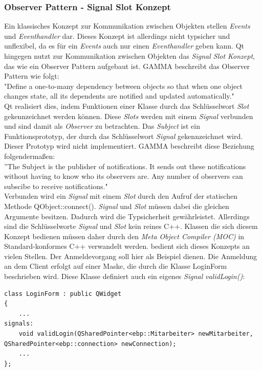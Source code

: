 \subsubsection{Observer Pattern - Signal Slot Konzept}
Ein klassisches Konzept zur Kommunikation zwischen Objekten stellen \textit{Events} und \textit{Eventhandler} dar. Dieses Konzept ist allerdings nicht typsicher und unflexibel, da es für ein \textit{Events} auch nur einen \textit{Eventhandler} geben kann\cite[S. 32]{Qt4}. Qt hingegen nutzt zur Kommunikation zwischen Objekten das \textit{Signal Slot Konzept}, das wie ein Observer Pattern aufgebaut ist. GAMMA beschreibt das Observer Pattern wie folgt: \\
"Define a one-to-many dependency between objects so that when one object changes state, all its dependents are notified and updated automatically\cite[S. 293]{Entwurfsmuster}."\\
Qt realisiert dies, indem Funktionen einer Klasse durch das Schlüsselwort \textit{Slot} gekennzeichnet werden können. Diese \textit{Slots} werden mit einem \textit{Signal} verbunden und sind damit als \textit{Observer} zu betrachten. Das \textit{Subject} ist ein Funktionsprototyp, der durch das Schlüsselwort \textit{Signal} gekennzeichnet wird. Dieser Prototyp wird nicht implementiert. GAMMA beschreibt diese Beziehung folgendermaßen:\\
''The Subject is the publisher of notifications. It sends out these notifications without having  to know who its observers are. Any number of observers can subscibe to receive notifications\cite[S. 294]{Entwurfsmuster}."\\
Verbunden wird ein \textit{Signal} mit einem \textit{Slot} durch den Aufruf der statischen Methode QObject::connect(). \textit{Signal} und \textit{Slot} müssen dabei die gleichen Argumente besitzen. Dadurch wird die Typsicherheit gewährleistet. Allerdings sind die Schlüsselworte \textit{Signal} und \textit{Slot} kein reines C++. Klassen die sich diesem Konzept bedienen müssen daher durch den \textit{Meta Object Compiler (MOC)} in Standard-konformes C++ verwandelt werden\cite[Vgl. S. 51]{Qt4}.
\EBP bedient sich dieses Konzepts an vielen Stellen. Der Anmeldevorgang soll hier als Beispiel dienen. Die Anmeldung an dem Client erfolgt auf einer Maske, die durch die Klasse LoginForm beschrieben wird. Diese Klasse definiert auch ein eigenes \textit{Signal} \textit{validLogin()}:
\begin{lstlisting}
class LoginForm : public QWidget
{
    ...
signals:
    void validLogin(QSharedPointer<ebp::Mitarbeiter> newMitarbeiter, QSharedPointer<ebp::connection> newConnection);
    ...
};
\end{lstlisting}
